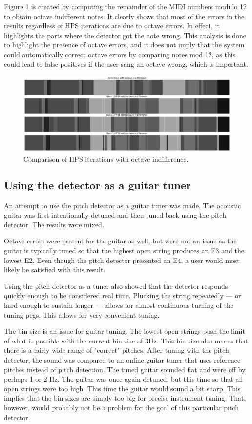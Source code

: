 Figure \ref{fig:hpsOctaveErrors} is created by computing the remainder of the MIDI numbers modulo 12 to obtain octave indifferent notes. It clearly shows that most of the errors in the results regardless of HPS iterations are due to octave errors. In effect, it highlights the parts where the detector got the note wrong. This analysis is done to highlight the presence of octave errors, and it does not imply that the system could automatically correct octave errors by comparing notes mod 12, as this could lead to false positives if the user sang an octave wrong, which is important.

\begin{figure}[ht]
    \centering
    \includegraphics[width=\textwidth]{./images/hpsOctaveErrors.png}
    \caption{Comparison of HPS iterations with octave indifference. \label{fig:hpsOctaveErrors}}
\end{figure}


\subsection{Using the detector as a guitar tuner}
An attempt to use the pitch detector as a guitar tuner was made. The acoustic guitar was first intentionally detuned and then tuned back using the pitch detector. The results were mixed.

Octave errors were present for the guitar as well, but were not an issue as the guitar is typically tuned so that the highest open string produces an E3 and the lowest E2. Even though the pitch detector presented an E4, a user would most likely be satisfied with this result.

Using the pitch detector as a tuner also showed that the detector responds quickly enough to be considered real time. Plucking the string repeatedly — or hard enough to sustain longer — allows for almost continuous turning of the tuning pegs. This allows for very convenient tuning.

The bin size is an issue for guitar tuning. The lowest open strings push the limit of what is possible with the current bin size of 3Hz. This bin size also means that there is a fairly wide range of "correct" pitches. After tuning with the pitch detector, the sound was compared to an online guitar tuner that uses reference pitches instead of pitch detection. The tuned guitar sounded flat and were off by perhaps 1 or 2 Hz. The guitar was once again detuned, but this time so that all open strings were too high. This time the guitar would sound a bit sharp. This implies that the bin sizes are simply too big for precise instrument tuning. That, however, would probably not be a problem for the goal of this particular pitch detector. 

